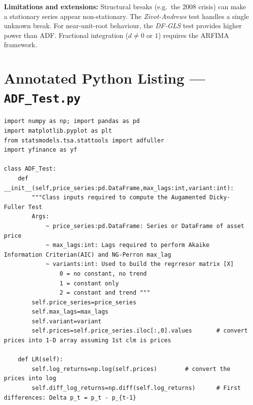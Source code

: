 \documentclass[10pt,a4paper,twocolumn]{article}
\begin{document}
\textbf{Limitations and extensions:}
Structural breaks (e.g.\ the 2008 crisis) can make a stationary
series appear non-stationary.  The \emph{Zivot-Andrews} test
handles a single unknown break.  For near-unit-root behaviour,
the \emph{DF-GLS} test provides higher power than ADF.  Fractional
integration ($d\neq 0$ or $1$) requires the ARFIMA framework.

\appendix
\onecolumn
\section{Annotated Python Listing --- \texttt{ADF\_Test.py}}

\begin{lstlisting}[style=python,
  caption={ADF\_Test.py --- step-annotated implementation of the
  Augmented Dickey-Fuller test from first principles}]
import numpy as np; import pandas as pd
import matplotlib.pyplot as plt
from statsmodels.tsa.stattools import adfuller
import yfinance as yf

class ADF_Test:
    def __init__(self,price_series:pd.DataFrame,max_lags:int,variant:int):
        """Class inputs required to compute the Augamented Dicky-Fuller Test
        Args:
            ~ price_series:pd.DataFrame: Series or DataFrame of asset price
            ~ max_lags:int: Lags required to perform Akaike Information Criterian(AIC) and NG-Perron max_lag
            ~ variants:int: Used to build the regrresor matrix [X]
                0 = no constant, no trend
                1 = constant only
                2 = constant and trend """
        self.price_series=price_series
        self.max_lags=max_lags
        self.variant=variant
        self.prices=self.price_series.iloc[:,0].values       # convert prices into 1-D array assuming 1st clm is prices
    
    def LR(self):
        self.log_returns=np.log(self.prices)        # convert the prices into log 
        self.diff_log_returns=np.diff(self.log_returns)      # First differences: Delta p_t = p_t - p_{t-1}
    

\end{lstlisting}
\end{document}
